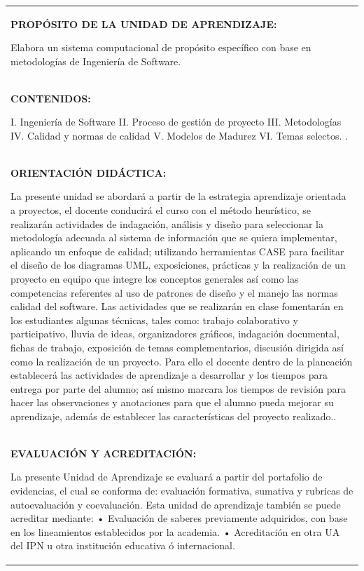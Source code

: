 \documentclass[10pt]{article}
\begin{document}
\begin{table}[H]
  \begin{tabular}{|p{}|}
    \hline
    \textbf{PROPÓSITO DE LA UNIDAD DE APRENDIZAJE:}

    Elabora un sistema computacional de propósito específico con base en metodologías de Ingeniería de Software. \\

    \textbf{CONTENIDOS:}

    I. Ingeniería de Software
II. Proceso de gestión de proyecto
III. Metodologías
IV. Calidad y normas de calidad
V.	Modelos de Madurez
VI. Temas selectos. .\\ 

    \textbf{ORIENTACIÓN DIDÁCTICA:}

    La presente unidad se abordará a partir de la estrategia aprendizaje orientada a proyectos, el docente conducirá  el curso con el método heurístico, se realizarán actividades de indagación, análisis y diseño para seleccionar la metodología adecuada al sistema de información que se quiera implementar, aplicando un enfoque de calidad; utilizando herramientas CASE para facilitar el diseño de los diagramas UML, exposiciones, prácticas y la realización de un proyecto en equipo que integre los conceptos generales así como las competencias referentes al uso de patrones de diseño y el manejo las normas calidad del software.
Las actividades que se realizarán en clase fomentarán en los estudiantes algunas técnicas, tales como: trabajo colaborativo y participativo, lluvia de ideas, organizadores gráficos, indagación documental, fichas de trabajo, exposición de temas complementarios, discusión dirigida así como la realización de un proyecto.
Para ello el docente dentro de la planeación establecerá las actividades de aprendizaje a desarrollar y los tiempos para entrega por parte del alumno; así mismo marcara los tiempos de revisión para hacer las observaciones y anotaciones para que el alumno pueda mejorar su aprendizaje, además de establecer las características del proyecto realizado.. \\ 

    \textbf{EVALUACIÓN Y ACREDITACIÓN:}

    La presente Unidad de Aprendizaje se evaluará a partir del portafolio de evidencias, el cual se conforma de: evaluación formativa, sumativa y rubricas de autoevaluación y coevaluación.
Esta unidad de aprendizaje también se puede acreditar mediante:
•	Evaluación de saberes previamente adquiridos, con base en los lineamientos establecidos por la academia.
•	Acreditación en otra UA del IPN u otra institución educativa ó internacional. \\ 


\end{tabular}
\end{table}
\end{document}
